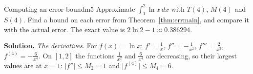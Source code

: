 \documentclass[11pt]{article}
\begin{document}
\begin{exmp}{Computing an error bound}{m5}
Approximate $\displaystyle\int_1^2\ln x\,dx$ with $T(4)$, $M(4)$ and $S(4)$. Find a bound on each error from Theorem~\ref{thm:errmain}, and compare it with the actual error. The exact value is $2\ln2-1\approx0.386294$.

\textbf{Solution.} \emph{The derivatives.} For $f(x)=\ln x$: $f'=\frac1x$, $f''=-\frac1{x^2}$, $f'''=\frac2{x^3}$, $f^{(4)}=-\frac6{x^4}$. On $[1,2]$ the functions $\frac1{x^2}$ and $\frac6{x^4}$ are decreasing, so their largest values are at $x=1$: $\lvert f''\rvert\le M_2=1$ and $\lvert f^{(4)}\rvert\le M_4=6$.


\end{exmp}
\end{document}
